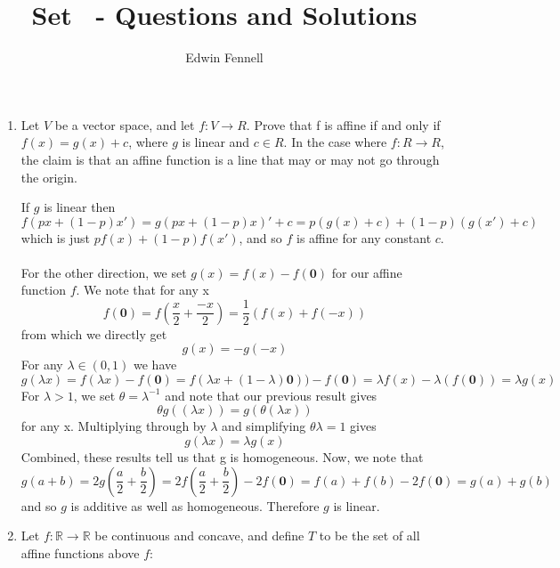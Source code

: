 \documentclass{article}
\title{Set \chapternumber\ - Questions and Solutions}
\author{Edwin Fennell}
\date{}
\newcommand{\chapternumber}{1}
\newenvironment{QandA}{\begin{enumerate}[label=\chapternumber.\arabic*]\bfseries\boldmath}
	{\end{enumerate}}
\newenvironment{answered}{\par\bigskip\normalfont\unboldmath}{}
\begin{document}
	\maketitle
	
	\noindent%
	\begin{QandA}
		\item Let $V$ be a vector space, and let $f : V \rightarrow R$. Prove that f is affine if and
		only if $f(x) = g(x) +c$, where $g$ is linear and $c \in R$.
		In the case where $f : R \rightarrow R$, the claim is that an affine function is a line
		that may or may not go through the origin.
		\begin{answered}
			If $g$ is linear then
			\[f(px+(1-p)x')=g(px+(1-p)x)'+c = p(g(x)+c)+(1-p)(g(x')+c)\]
		which is just $pf(x)+(1-p)f(x')$, and so $f$ is affine for any constant $c$.
		\\\\
		For the other direction, we set $g(x) = f(x)-f(\textbf{0})$ for our affine function $f$.
		We note that for any x
		\[f(\textbf{0})=f\left(\frac{x}{2}+\frac{-x}{2}\right)=\frac{1}{2}(f(x)+f(-x))\]
		from which we directly get
		\[g(x)=-g(-x)\]
		For any $\lambda\in(0,1)$ we have 
		\[g(\lambda x) = f(\lambda x)-f(\textbf{0}) = f(\lambda x + (1-\lambda)\textbf{0}))-f(\textbf{0}) = \lambda f(x) - \lambda(f(\textbf{0}))=\lambda g(x)\]
		For $\lambda>1$, we set $\theta=\lambda^{-1}$ and note that our previous result gives
		\[\theta g((\lambda x))=g(\theta(\lambda x))\]
		for any x. Multiplying through by $\lambda$ and simplifying $\theta\lambda=1$ gives
		\[g(\lambda x)=\lambda g(x)\]
		Combined, these results tell us that g is homogeneous.
		Now, we note that \[g(a+b)= 2g\left(\frac{a}{2}+\frac{b}{2}\right)=2f\left(\frac{a}{2}+\frac{b}{2}\right)-2f(\textbf{0})=f(a)+f(b)-2f(\textbf{0})=g(a)+g(b)\]
		and so $g$ is additive as well as homogeneous. Therefore $g$ is linear.
		\end{answered}
	
		\item Let $f : \mathbb{R} \rightarrow \mathbb{R}$ be continuous and concave, and define $T$ to be the set of
		all affine functions above $f$:
		

\end{QandA}
\end{document}
